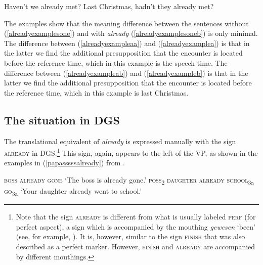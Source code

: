 \begin{exe}
\ex\label{alreadyexamplesoneb}\begin{xlist}  
\ex Haven't we already met? \label{alreadyexamplea}
\ex Last Christmas, hadn't they already met? \label{alreadyexampleb}
\end{xlist}
\end{exe} 

\noindent The examples show that the meaning difference between the sentences without (\ref{alreadyexamplesone}) and with \textit{already} (\ref{alreadyexamplesoneb}) is only minimal. The difference between (\ref{alreadyexampleaa}) and (\ref{alreadyexamplea}) is that in the latter we find the additional presupposition that the encounter is located before the reference time, which in this example is the speech time. The difference between (\ref{alreadyexampleab}) and (\ref{alreadyexampleb}) is that in the latter we find the additional presupposition that the encounter is located before the reference time, which in this example is last Christmas.

\subsection{The situation in DGS}
The translational equivalent of \textit{already} is expressed manually with the sign \textsc{already} in DGS.\footnote{ Note that the sign \textsc{already} is different from what is usually labeled \textsc{perf} (for perfect aspect), a sign which is accompanied by the mouthing \textit{gewesen} `been' (see, for example, \citealt[292]{happ2014vork}). It is, however, similar to the sign \textsc{finish} that was also described as a perfect marker. However, \textsc{finish} and \textsc{already} are accompanied by different mouthings.} This sign, again, appears to the left of the VP, as shown in the examples in (\ref{papasssssalready}) from \citet[155]{papaspyrou2008grammatik}.

\begin{exe}
\ex\label{papasssssalready}\begin{xlist} 
\ex \textsc{boss already gone} 
\glt `The boss is already gone.' \label{alreadygonepapaa}
\ex \textsc{poss}\textsubscript{2} \textsc{daughter already school}\textsubscript{3a} \textsc{go}\textsubscript{3a}
\glt `Your daughter already went to school.' \label{alreadygonepapab}
\end{xlist}
\end{exe} 

